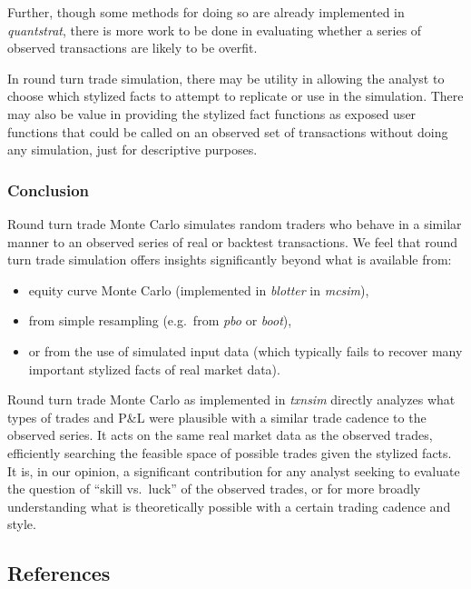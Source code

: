 Further, though some methods for doing so are already implemented in
\emph{quantstrat}, there is more work to be done in evaluating whether a
series of observed transactions are likely to be overfit.

In round turn trade simulation, there may be utility in allowing the
analyst to choose which stylized facts to attempt to replicate or use in
the simulation. There may also be value in providing the stylized fact
functions as exposed user functions that could be called on an observed
set of transactions without doing any simulation, just for descriptive
purposes.

\hypertarget{conclusion}{%
\subsubsection{Conclusion}\label{conclusion}}

Round turn trade Monte Carlo simulates random traders who behave in a
similar manner to an observed series of real or backtest transactions.
We feel that round turn trade simulation offers insights significantly
beyond what is available from:

\begin{itemize}
\tightlist
\item
  equity curve Monte Carlo (implemented in \emph{blotter} in
  \emph{mcsim}),
\item
  from simple resampling (e.g.~from \emph{pbo} or \emph{boot}),
\item
  or from the use of simulated input data (which typically fails to
  recover many important stylized facts of real market data).
\end{itemize}

Round turn trade Monte Carlo as implemented in \emph{txnsim} directly
analyzes what types of trades and P\&L were plausible with a similar
trade cadence to the observed series. It acts on the same real market
data as the observed trades, efficiently searching the feasible space of
possible trades given the stylized facts. It is, in our opinion, a
significant contribution for any analyst seeking to evaluate the
question of ``skill vs.~luck'' of the observed trades, or for more
broadly understanding what is theoretically possible with a certain
trading cadence and style.

\hypertarget{references}{%
\subsection{References}\label{references}}

